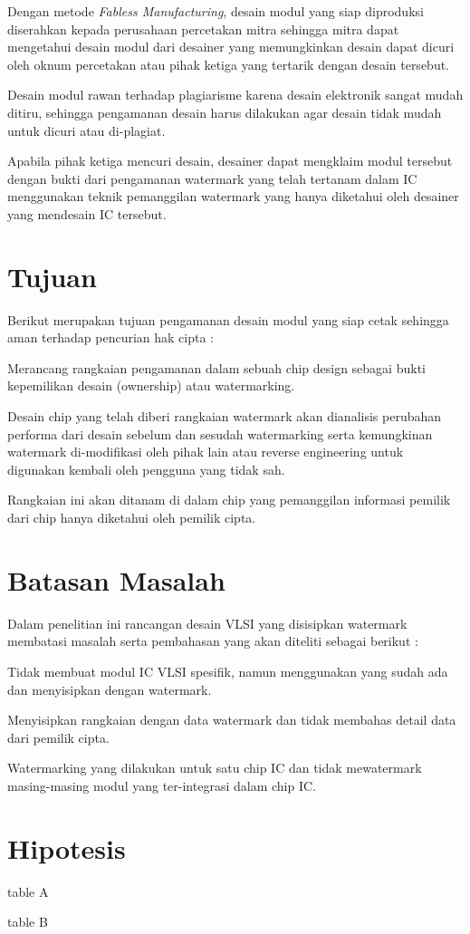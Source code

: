Dengan metode \textit{Fabless Manufacturing}, desain modul yang siap diproduksi diserahkan kepada perusahaan percetakan mitra sehingga mitra dapat mengetahui desain modul dari desainer yang memungkinkan desain dapat dicuri oleh oknum percetakan atau pihak ketiga yang tertarik dengan desain tersebut.

Desain modul rawan terhadap plagiarisme karena desain elektronik sangat mudah ditiru, sehingga pengamanan desain harus dilakukan agar desain tidak mudah untuk dicuri atau di-plagiat.

Apabila pihak ketiga mencuri desain, desainer dapat mengklaim modul tersebut dengan bukti dari pengamanan watermark yang telah tertanam dalam IC menggunakan teknik pemanggilan watermark yang hanya diketahui oleh desainer yang mendesain IC tersebut.

\section{Tujuan}
Berikut merupakan tujuan pengamanan desain modul yang siap cetak sehingga aman terhadap pencurian hak cipta :

Merancang rangkaian pengamanan dalam sebuah chip design sebagai bukti kepemilikan desain (ownership) atau watermarking.

Desain chip yang telah diberi rangkaian watermark akan dianalisis perubahan performa dari desain sebelum dan sesudah watermarking serta kemungkinan watermark di-modifikasi oleh pihak lain atau reverse engineering untuk digunakan kembali oleh pengguna yang tidak sah.

Rangkaian ini akan ditanam di dalam chip yang pemanggilan informasi pemilik dari chip hanya diketahui oleh pemilik cipta.

\section{Batasan Masalah}
Dalam penelitian ini rancangan desain VLSI yang disisipkan watermark membatasi masalah serta pembahasan yang akan diteliti sebagai berikut :

Tidak membuat modul IC VLSI spesifik, namun menggunakan yang sudah ada dan menyisipkan dengan watermark.

Menyisipkan rangkaian dengan data watermark dan tidak membahas detail data dari pemilik cipta.

Watermarking yang dilakukan untuk satu chip IC dan tidak mewatermark masing-masing modul yang ter-integrasi dalam chip IC.

\section{Hipotesis}
\blindtext[1]
\begin{table}
	\caption{table A}
\end{table}
\begin{table}
	\caption{table B}
\end{table}
